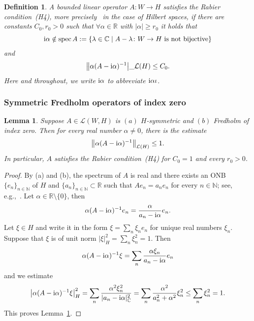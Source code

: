 \documentclass[pdftex]{sigma}
\numberwithin{equation}{section}
\newtheorem{Lemma}[Theorem]{Lemma}
\newtheorem{Definition}[Theorem]{Definition}
\newcommand{\C}{{\mathbb{C}}}
\newcommand{\N}{{\mathbb{N}}}
\newcommand{\R}{{\mathbb{R}}}
\newcommand{\Ll}{{\mathcal{L}}} %
\newcommand{\spec}{\mathrm{spec}\,} %
\def\abs#1{\mathopen|#1\mathclose|}
\newcommand{\1}{{{\mathchoice {\rm 1\mskip-4mu l} {\rm 1\mskip-4mu l}
{\rm 1\mskip-4.5mu l} {\rm 1\mskip-5mu l}}}}
\begin{document}
\begin{Definition}%
A bounded linear operator $A\colon W\to H$ \textit{satisfies the
Rabier condition}~(H4), more precisely~\cite[equation~(1.4)]{Rabier:2004a}
in the case of Hilbert spaces, if there are constants $C_0,r_0>0$
such that $\forall \alpha\in\R$ with $\abs{\alpha}\ge r_0$ it holds that
\[
 {\rm i}\alpha\notin
 \spec A
 :=\{\lambda\in \C\mid\text{$A-\lambda\colon W\to H$ is not
 bijective}\}
\]
and
\begin{equation}\label{eq:Rabier}
 \bigl\|\alpha (A-{\rm i}\alpha)^{-1}\bigr|\_{\Ll(H)}
 \le C_0 .
\end{equation}
Here and throughout, we write ${\rm i}\alpha$ to abbreviate ${\rm i}\alpha\iota$.
\end{Definition}

\subsubsection*{Symmetric Fredholm operators of index zero}

\begin{Lemma}\label{le:Rabier-symmetric}
Suppose $A\in\Ll(W,H)$ is $(a)$ $H$-symmetric
and $(b)$ Fredholm of index zero.
Then for every real number $\alpha\not= 0$, there is the estimate
\[
 \bigl\|\alpha (A-{\rm i}\alpha)^{-1}\bigr\|_{\Ll(H)}
 \le 1 .
\]
In particular, $A$ satisfies the Rabier condition~{\rm (H4)}
for $C_0=1$ and every $r_0>0$.
\end{Lemma}

\begin{proof}
By (a) and (b), the spectrum of $A$ is real
and there exists an ONB $\{e_n\}_{n\in\N}$ of $H$
and $\{a_n\}_{n\in\N}\subset \R$ such that $Ae_n=a_ne_n$
for every $n\in\N$; see, e.g.,~\cite[Appendix~D]{Frauenfelder:2024d}.
Let $\alpha\in\R\setminus\{0\}$, then
\[
 \alpha(A-{\rm i}\alpha)^{-1} e_n
 =\frac{\alpha}{a_n-{\rm i}\alpha} e_n .
\]
Let $\xi\in H$ and write it in the form
$\xi=\sum_n\xi_ne_n$ for unique real numbers $\xi_n$.
Suppose that $\xi$ is of unit norm $\abs{\xi}_{H}^2=\sum_n\xi_n^2=1$.
Then
\[
 \alpha(A-{\rm i}\alpha)^{-1}\xi
 =\sum_n \frac{\alpha\xi_n}{a_n-{\rm i}\alpha} e_n
\]
and we estimate
\begin{equation*}
\begin{split}
 \bigl|\alpha(A-{\rm i}\alpha)^{-1}\xi\bigr|_{H}^2
 =\sum_n \frac{\alpha^2\xi_n^2}{\abs{a_n-{\rm i}\alpha}_{\C}^2}
 =\sum_n \frac{\alpha^2}{a_n^2+\alpha^2} \xi_n^2
 \le \sum_n \xi_n^2
 =1.
\end{split}
\end{equation*}
This proves Lemma~\ref{le:Rabier-symmetric}.
\end{proof}
\end{document}
